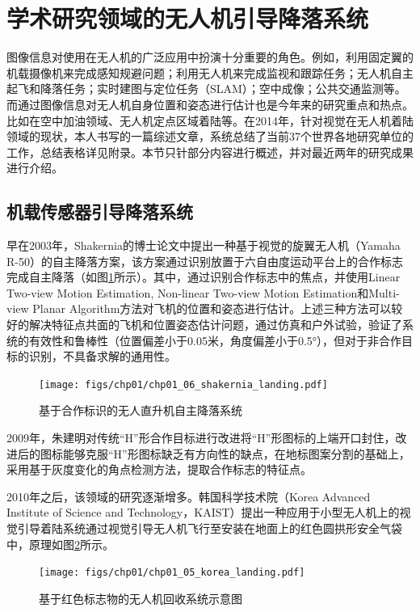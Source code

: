 \section{学术研究领域的无人机引导降落系统}
图像信息对使用在无人机的广泛应用中扮演十分重要的角色。例如，利用固定翼的机载摄像机来完成感知规避问题\cite{mejias2010vision}；利用无人机来完成监视和跟踪任务\cite{campoy2009computer}\cite{mejias2006visual}；无人机自主起飞和降落任务\cite{saripalli2002vision}；实时建图与定位任务（SLAM）\cite{weiss2011monocular}；空中成像；公共交通监测等。而通过图像信息对无人机自身位置和姿态进行估计也是今年来的研究重点和热点。比如在空中加油领域、无人机定点区域着陆等。在2014年，针对视觉在无人机着陆领域的现状，本人书写的一篇综述文章\cite{kong2014vision}，系统总结了当前37个世界各地研究单位的工作，总结表格详见附录。本节只针部分内容进行概述，并对最近两年的研究成果进行介绍。

\subsection{机载传感器引导降落系统} 

早在2003年，Shakernia\cite{shakernia2003vision}的博士论文中提出一种基于视觉的旋翼无人机（Yamaha R-50）的自主降落方案，该方案通过识别放置于六自由度运动平台上的合作标志完成自主降落（如图\ref{fig:chp01_06_shakernia_landing}所示）。其中，通过识别合作标志中的焦点，并使用Linear Two-view Motion Estimation, Non-linear Two-view Motion Estimation和Multi-view Planar Algorithm方法对飞机的位置和姿态进行估计。上述三种方法可以较好的解决特征点共面的飞机和位置姿态估计问题，通过仿真和户外试验，验证了系统的有效性和鲁棒性（位置偏差小于0.05米，角度偏差小于0.5°），但对于非合作目标的识别，不具备求解的通用性。

\begin{figure}[!tb]   
	\centering	
	\texttt{[image: figs/chp01/chp01\_06\_shakernia\_landing.pdf]}
	\caption{基于合作标识的无人直升机自主降落系统\cite{shakernia2003vision}}
	\label{fig:chp01_06_shakernia_landing}
\end{figure}


2009年，朱建明\cite{Zhu_Master_2009}对传统“H”形合作目标进行改进将“H”形图标的上端开口封住，改进后的图标能够克服“H”形图标缺乏有方向性的缺点，在地标图案分割的基础上，采用基于灰度变化的角点检测方法，提取合作标志的特征点。

2010年之后，该领域的研究逐渐增多。韩国科学技术院（Korea Advanced Institute of Science and Technology，KAIST）提出一种应用于小型无人机上的视觉引导着陆系统通过视觉引导无人机飞行至安装在地面上的红色圆拱形安全气袋中\cite{huh2010vision}，原理如图\ref{fig:chp01_05_korea_landing}所示。
\begin{figure}[!tb]   
	\centering	
	\texttt{[image: figs/chp01/chp01\_05\_korea\_landing.pdf]}
	\caption{基于红色标志物的无人机回收系统示意图\cite{huh2010vision}}
	\label{fig:chp01_05_korea_landing}
\end{figure}

